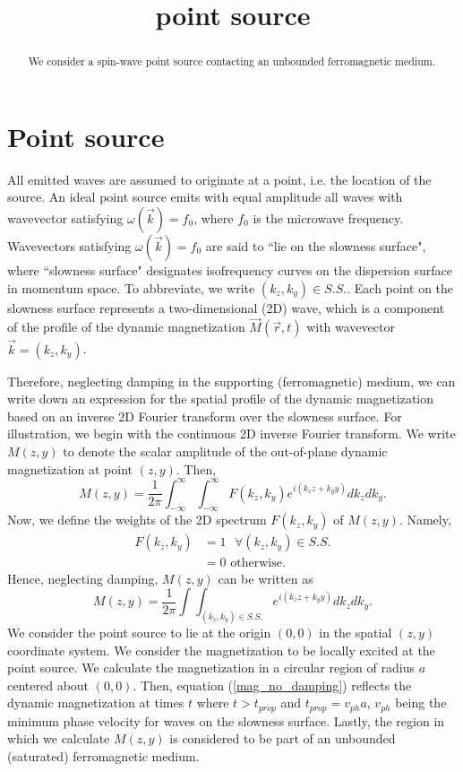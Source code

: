 \documentclass{article}
\title{point source}
\begin{document}
\maketitle
\begin{abstract}
We consider a spin-wave point source contacting an unbounded ferromagnetic medium.
\end{abstract}
\section{Point source}
All emitted waves are assumed to originate at a point, i.e. the location of the source. 
An ideal point source emits with equal amplitude all waves with wavevector satisfying $\omega ( \vec{k} ) = f_{0}$, where $f_{0}$ is the microwave frequency. 
Wavevectors satisfying $\omega ( \vec{k} ) = f_{0}$ are said to ``lie on the slowness surface", where ``slowness surface" designates isofrequency curves on the dispersion surface in momentum space. 
To abbreviate, we write $(k_{z},k_{y}) \in S.S.$.
Each point on the slowness surface represents a two-dimensional (2D) wave, which is a component of the profile of the dynamic magnetization $\vec{M}(\vec{r} , t)$ with wavevector $\vec{k} = (k_{z} , k_{y})$. 

Therefore, neglecting damping in the supporting (ferromagnetic) medium, we can write down an expression for the spatial profile of the dynamic magnetization based on an inverse 2D Fourier transform over the slowness surface. 
For illustration, we begin with the continuous 2D inverse Fourier transform.
We write $M(z , y)$ to denote the scalar amplitude of the out-of-plane dynamic magnetization at point $(z, y)$. 
Then,
\begin{equation}
M(z,y) =\frac{1}{2\pi} \int_{-\infty}^{\infty} \int_{-\infty}^{\infty} F(k_{z},k_{y}) e^{i (k_{z} z + k_{y} y)} dk_{z} dk_{y} .
\end{equation}
Now, we define the weights of the 2D spectrum $F(k_{z},k_{y})$ of $M(z , y)$. Namely,
\begin{align}
F(k_{z},k_{y}) &= 1 \text{  } \forall (k_{z},k_{y}) \in S.S. \\
&= 0 \text{ otherwise.} \nonumber
\end{align}
Hence, neglecting damping, $M(z, y)$ can be written as
\begin{equation}\label{mag_no_damping}
M(z,y) = \frac{1}{2\pi} \int\int_{(k_{z},k_{y}) \in S.S.} e^{i (k_{z} z + k_{y} y)} dk_{z} dk_{y} .
\end{equation}
We consider the point source to lie at the origin $(0,0)$ in the spatial $(z,y)$ coordinate system. We consider the magnetization to be locally excited at the point source. We calculate the magnetization in a circular region of radius $a$ centered about $(0,0)$. Then, equation (\ref{mag_no_damping}) reflects the dynamic magnetization at times $t$ where $t > t_{prop}$ and $t_{prop} = v_{ph}a$, $v_{ph}$ being the minimum phase velocity for waves on the slowness surface. Lastly, the region in which we calculate $M(z, y)$ is considered to be part of an unbounded (saturated) ferromagnetic medium.
\end{document}
